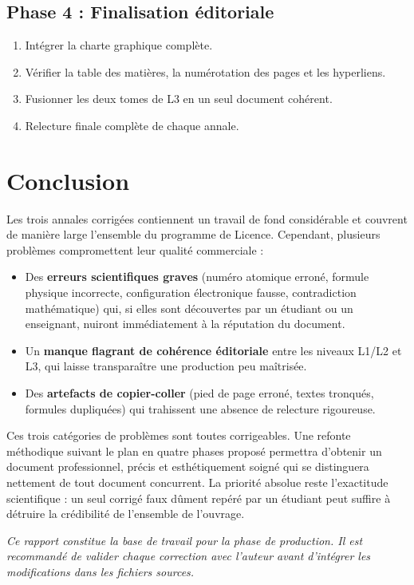 \documentclass[12pt,a4paper]{article}
\begin{document}
\subsection{Phase 4 : Finalisation éditoriale}

\begin{enumerate}
  \item Intégrer la charte graphique complète.
  \item Vérifier la table des matières, la numérotation des pages et les hyperliens.
  \item Fusionner les deux tomes de L3 en un seul document cohérent.
  \item Relecture finale complète de chaque annale.
\end{enumerate}

\section{Conclusion}

Les trois annales corrigées contiennent un travail de fond considérable et couvrent de manière large l'ensemble du programme de Licence. Cependant, plusieurs problèmes compromettent leur qualité commerciale :

\begin{itemize}
  \item Des \textbf{erreurs scientifiques graves} (numéro atomique erroné, formule physique incorrecte, configuration électronique fausse, contradiction mathématique) qui, si elles sont découvertes par un étudiant ou un enseignant, nuiront immédiatement à la réputation du document.
  \item Un \textbf{manque flagrant de cohérence éditoriale} entre les niveaux L1/L2 et L3, qui laisse transparaître une production peu maîtrisée.
  \item Des \textbf{artefacts de copier-coller} (pied de page erroné, textes tronqués, formules dupliquées) qui trahissent une absence de relecture rigoureuse.
\end{itemize}

Ces trois catégories de problèmes sont toutes corrigeables. Une refonte méthodique suivant le plan en quatre phases proposé permettra d'obtenir un document professionnel, précis et esthétiquement soigné qui se distinguera nettement de tout document concurrent. La priorité absolue reste l'exactitude scientifique : un seul corrigé faux dûment repéré par un étudiant peut suffire à détruire la crédibilité de l'ensemble de l'ouvrage.

\vspace{1cm}
\begin{tcolorbox}[colback=RoyalBlue!8, colframe=RoyalBlue]
\centering\small\itshape
Ce rapport constitue la base de travail pour la phase de production. Il est recommandé de valider chaque correction avec l'auteur avant d'intégrer les modifications dans les fichiers sources.
\end{tcolorbox}
\end{document}
